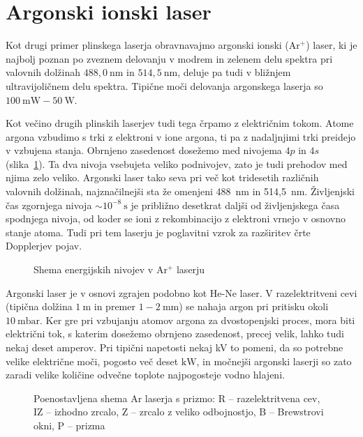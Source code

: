 \section{Argonski ionski laser}
Kot drugi primer plinskega laserja obravnavajmo argonski ionski (Ar$^+$) laser,
ki je najbolj poznan po zveznem delovanju v modrem in zelenem delu spektra pri 
valovnih dolžinah $488,0~\si{\nano\metre}$ in $514,5~\si{\nano\metre}$, deluje 
pa tudi v bližnjem ultravijoličnem delu spektra. Tipične moči delovanja argonskega laserja
so $100~\si{\milli\watt} - 50~\si{\watt}$.

Kot večino drugih plinskih laserjev tudi tega črpamo z električnim tokom.
Atome argona vzbudimo s trki z elektroni v ione argona, ti pa z nadaljnjimi
trki preidejo v vzbujena stanja. Obrnjeno zasedenost
dosežemo med nivojema $4p$ in $4s$ (slika~\ref{fig:ArE}). 
Ta dva nivoja vsebujeta veliko podnivojev, zato je tudi prehodov med
njima zelo veliko. Argonski laser tako seva pri več kot tridesetih različnih
valovnih dolžinah, najznačilnejši sta že omenjeni 488~nm in 514,5~nm. 
Življenjski čas zgornjega nivoja $\sim 10^{-8}~\si{\second}$ je približno 
desetkrat daljši od življenjskega časa spodnjega nivoja, od koder se ioni
z rekombinacijo z elektroni vrnejo v osnovno stanje atoma. Tudi pri tem laserju
je poglavitni vzrok za razširitev črte Dopplerjev 
pojav.

\begin{figure}[h]
\centering
\def\svgwidth{80truemm} 

\caption{Shema energijskih nivojev v Ar$^+$ laserju}
\label{fig:ArE}
\end{figure}

Argonski laser je v osnovi zgrajen podobno kot He-Ne laser. 
V razelektritveni cevi
(tipična dolžina $1~\si{\metre}$ in premer $1-2~\si{\milli\metre}$)
se nahaja argon pri pritisku okoli $10~\si{\milli\bar}$. Ker gre pri 
vzbujanju atomov argona za dvostopenjski proces, mora biti električni tok, 
s katerim dosežemo obrnjeno zasedenost, precej velik, lahko tudi nekaj deset amperov. 
Pri tipični napetosti nekaj kV to pomeni, da so potrebne velike električne moči, 
pogosto več deset $\si{\kilo\watt}$, in močnejši argonski laserji so zato zaradi 
velike količine odvečne toplote najpogosteje vodno hlajeni.

\begin{figure}[h]
\centering
\def\svgwidth{110truemm} 

\caption{Poenostavljena shema Ar laserja s prizmo: R -- razelektritvena cev, 
IZ -- izhodno zrcalo, Z -- zrcalo z veliko odbojnostjo, B -- Brewstrovi okni, 
P -- prizma
}
\label{fig:ArS}
\end{figure}


